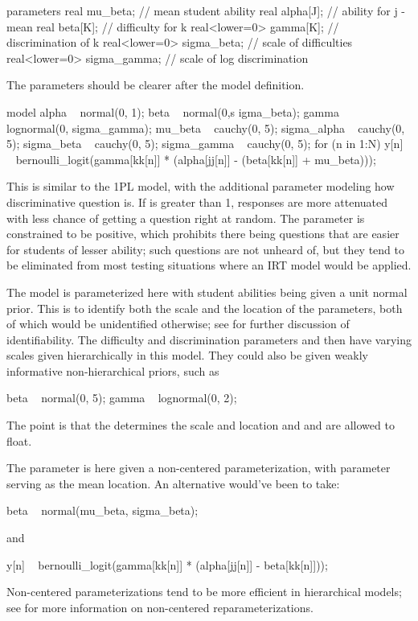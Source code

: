 \begin{stancode}
parameters {    
  real mu_beta;                  // mean student ability
  real alpha[J];               // ability for j - mean
  real beta[K];                // difficulty for k
  real<lower=0> gamma[K];      // discrimination of k
  real<lower=0> sigma_beta;    // scale of difficulties 
  real<lower=0> sigma_gamma;   // scale of log discrimination
}
\end{stancode}
%
The parameters should be clearer after the model definition.
%
\begin{stancode}
model {
  alpha ~ normal(0, 1);
  beta ~ normal(0,s igma_beta);   
  gamma ~ lognormal(0, sigma_gamma);
  mu_beta ~ cauchy(0, 5);
  sigma_alpha ~ cauchy(0, 5);
  sigma_beta ~ cauchy(0, 5);
  sigma_gamma ~ cauchy(0, 5);
  for (n in 1:N)
    y[n] ~ bernoulli_logit(gamma[kk[n]] 
                           * (alpha[jj[n]] - (beta[kk[n]] + mu_beta)));
}
\end{stancode}
%
This is similar to the 1PL model, with the additional parameter
 modeling how discriminative question  is.  If
 is greater than 1, responses are more attenuated with
less chance of getting a question right at random.  The parameter
 is constrained to be positive, which prohibits there
being questions that are easier for students of lesser ability;  such
questions are not unheard of, but they tend to be eliminated from most
testing situations where an IRT model would be applied.

The model is parameterized here with student abilities 
being given a unit normal prior.  This is to identify both the scale
and the location of the parameters, both of which would be
unidentified otherwise; see  for
further discussion of identifiability. The difficulty and
discrimination parameters  and  then have
varying scales given hierarchically in this model.  They could also be
given weakly informative non-hierarchical priors, such as
%
\begin{stancode}
  beta ~ normal(0, 5);
  gamma ~ lognormal(0, 2);
\end{stancode}
%
The point is that the  determines the scale and location
and  and  are allowed to float.  

The  parameter is here given a non-centered
parameterization, with parameter  serving as the mean
 location. An alternative would've been to take:
%
\begin{stancode}
  beta ~ normal(mu_beta, sigma_beta);
\end{stancode}
%
and
%
\begin{stancode}
  y[n] ~ bernoulli_logit(gamma[kk[n]] * (alpha[jj[n]] - beta[kk[n]]));
\end{stancode}
%
Non-centered parameterizations tend to be more efficient in
hierarchical models; see  for more
information on non-centered reparameterizations.  

